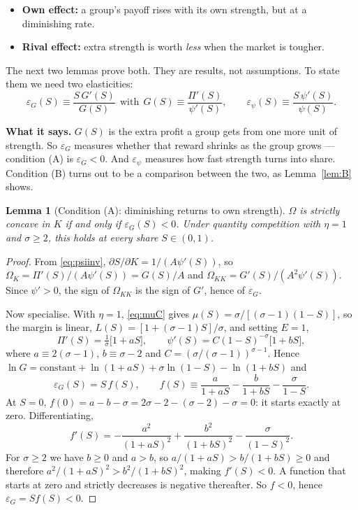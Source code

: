 \documentclass[11pt]{article}
\newcommand{\says}[1]{\smallskip\noindent\textbf{What it says.} #1\smallskip}
\theoremstyle{plain}
\newtheorem{lemma}{Lemma}
\theoremstyle{remark}
\theoremstyle{definition}
\begin{document}
\begin{itemize}
\item[\textbf{(A)}] \textbf{Own effect:} a group's payoff rises with its own strength,
but at a diminishing rate.
\item[\textbf{(B)}] \textbf{Rival effect:} extra strength is worth \emph{less} when
the market is tougher.
\end{itemize}

\noindent The next two lemmas prove both. They are results, not assumptions. To state
them we need two elasticities:
\begin{equation}
  \varepsilon_G(S)\equiv\frac{S\,G'(S)}{G(S)}\ \ \text{with}\ \ G(S)\equiv\frac{\Pi'(S)}{\psi'(S)},
  \qquad
  \varepsilon_\psi(S)\equiv\frac{S\,\psi'(S)}{\psi(S)} .
  \label{eq:elast}
\end{equation}

\says{$G(S)$ is the extra profit a group gets from one more unit of strength. So
$\varepsilon_G$ measures whether that reward shrinks as the group grows --- condition
(A) is $\varepsilon_G<0$. And $\varepsilon_\psi$ measures how fast strength turns into
share. Condition (B) turns out to be a comparison between the two, as Lemma~\ref{lem:B}
shows.}

\begin{lemma}[Condition (A): diminishing returns to own strength]\label{lem:A}
$\Omega$ is strictly concave in $K$ if and only if $\varepsilon_G(S)<0$. Under
quantity competition with $\eta=1$ and $\sigma\ge2$, this holds at \emph{every} share
$S\in(0,1)$.
\end{lemma}

\begin{proof}
From \eqref{eq:psiinv}, $\partial S/\partial K=1/(A\psi'(S))$, so
$\Omega_K=\Pi'(S)/(A\psi'(S))=G(S)/A$ and $\Omega_{KK}=G'(S)/(A^2\psi'(S))$. Since
$\psi'>0$, the sign of $\Omega_{KK}$ is the sign of $G'$, hence of $\varepsilon_G$.

Now specialise. With $\eta=1$, \eqref{eq:muC} gives
$\mu(S)=\sigma/[(\sigma-1)(1-S)]$, so the margin is linear,
$L(S)=[1+(\sigma-1)S]/\sigma$, and setting $E=1$,
\[
  \Pi'(S)=\tfrac1\sigma\bigl[1+aS\bigr],\qquad
  \psi'(S)=C(1-S)^{-\sigma}\bigl[1+bS\bigr],
\]
where $a\equiv2(\sigma-1)$, $b\equiv\sigma-2$ and $C=(\sigma/(\sigma-1))^{\sigma-1}$.
Hence $\ln G=\text{constant}+\ln(1+aS)+\sigma\ln(1-S)-\ln(1+bS)$ and
\begin{equation}
  \varepsilon_G(S)=S\,f(S),\qquad
  f(S)\equiv\frac{a}{1+aS}-\frac{b}{1+bS}-\frac{\sigma}{1-S}.
  \label{eq:epsG}
\end{equation}
At $S=0$, $f(0)=a-b-\sigma=2\sigma-2-(\sigma-2)-\sigma=0$: it starts exactly at zero.
Differentiating,
\[
  f'(S)=-\frac{a^2}{(1+aS)^2}+\frac{b^2}{(1+bS)^2}-\frac{\sigma}{(1-S)^2}.
\]
For $\sigma\ge2$ we have $b\ge0$ and $a>b$, so $a/(1+aS)>b/(1+bS)\ge0$ and therefore
$a^2/(1+aS)^2>b^2/(1+bS)^2$, making $f'(S)<0$. A function that starts at zero and
strictly decreases is negative thereafter. So $f<0$, hence $\varepsilon_G=Sf(S)<0$.
\end{proof}
\end{document}
